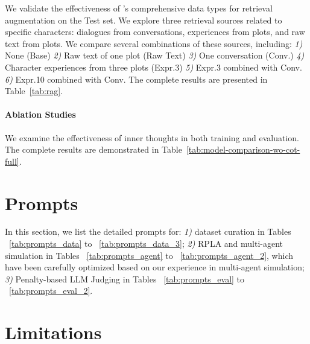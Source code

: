 We validate the effectiveness of \method’s comprehensive data types for retrieval augmentation on the \method Test set. 
We explore three retrieval sources related to specific characters: dialogues from conversations, experiences from plots, and raw text from plots. 
We compare several combinations of these sources, including:
\textit{1)} None (Base)
\textit{2)} Raw text of one plot (Raw Text)
\textit{3)} One conversation (Conv.)
\textit{4)} Character experiences from three plots (Expr.3)
\textit{5)} Expr.3 combined with Conv.
\textit{6)} Expr.10 combined with Conv.
The complete results are presented in Table~\ref{tab:rag}.

\paragraph{Ablation Studies}

We examine the effectiveness of inner thoughts in both training and evaluation. 
The complete results are demonstrated in Table~\ref{tab:model-comparison-wo-cot-full}.










\section{Prompts}
\label{sec:prompts}

In this section, we list the detailed prompts for:
\textit{1)} dataset curation in Tables ~\ref{tab:prompts_data} to ~\ref{tab:prompts_data_3}; 
\textit{2)} RPLA and multi-agent simulation in Tables ~\ref{tab:prompts_agent} to ~\ref{tab:prompts_agent_2}, which 
have been carefully optimized based on our experience in multi-agent simulation; 
\textit{3)} Penalty-based LLM Judging in Tables ~\ref{tab:prompts_eval} to ~\ref{tab:prompts_eval_2}. 

















\section{Limitations}

